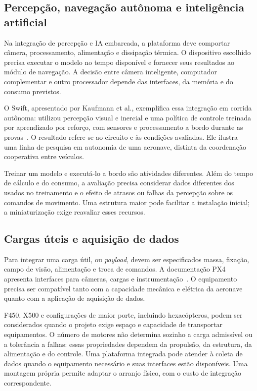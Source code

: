 \documentclass[11pt,a4paper,oneside]{book}
\numberwithin{equation}{chapter}
\begin{document}
\subsection{Percepção, navegação autônoma e inteligência artificial}
Na integração de percepção e IA embarcada, a plataforma deve comportar câmera, processamento, alimentação e dissipação térmica. O dispositivo escolhido precisa executar o modelo no tempo disponível e fornecer seus resultados ao módulo de navegação. A decisão entre câmera inteligente, computador complementar e outro processador depende das interfaces, da memória e do consumo previstos.

O Swift, apresentado por Kaufmann et al., exemplifica essa integração em corrida autônoma: utilizou percepção visual e inercial e uma política de controle treinada por aprendizado por reforço, com sensores e processamento a bordo durante as provas~\cite{swift}. O resultado refere-se ao circuito e às condições avaliadas. Ele ilustra uma linha de pesquisa em autonomia de uma aeronave, distinta da coordenação cooperativa entre veículos.

Treinar um modelo e executá-lo a bordo são atividades diferentes. Além do tempo de cálculo e do consumo, a avaliação precisa considerar dados diferentes dos usados no treinamento e o efeito de atrasos ou falhas da percepção sobre os comandos de movimento. Uma estrutura maior pode facilitar a instalação inicial; a miniaturização exige reavaliar esses recursos.

\subsection{Cargas úteis e aquisição de dados}
Para integrar uma carga útil, ou \emph{payload}, devem ser especificados massa, fixação, campo de visão, alimentação e troca de comandos. A documentação PX4 apresenta interfaces para câmeras, cargas e instrumentação~\cite{px4payloads}. O equipamento precisa ser compatível tanto com a capacidade mecânica e elétrica da aeronave quanto com a aplicação de aquisição de dados.

F450, X500 e configurações de maior porte, incluindo hexacópteros, podem ser considerados quando o projeto exige espaço e capacidade de transportar equipamentos. O número de motores não determina sozinho a carga admissível ou a tolerância a falhas: essas propriedades dependem da propulsão, da estrutura, da alimentação e do controle. Uma plataforma integrada pode atender à coleta de dados quando o equipamento necessário e suas interfaces estão disponíveis. Uma montagem própria permite adaptar o arranjo físico, com o custo de integração correspondente.
\end{document}
